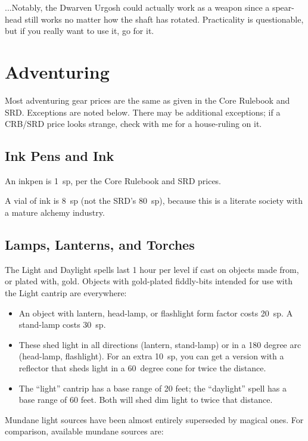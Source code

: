 ...Notably, the Dwarven Urgosh could actually work as a weapon since a
spear-head still works no matter how the shaft has rotated. Practicality
is questionable, but if you really want to use it, go for it.
%

%
%
\section{Adventuring}

Most adventuring gear prices are the same as given in the Core Rulebook and
SRD. Exceptions are noted below. There may be additional exceptions; if a
CRB/SRD price looks strange, check with me for a house-ruling on it.

%
\subsection{Ink Pens and Ink}

An inkpen is 1~sp, per the Core Rulebook and SRD prices.

A vial of ink is 8~sp (not the SRD's 80~sp), because this is a literate
society with a mature alchemy industry.
%

%
\subsection{Lamps, Lanterns, and Torches}

The Light and Daylight spells last 1 hour per level if cast on objects made
from, or plated with, gold. Objects with gold-plated fiddly-bits intended
for use with the Light cantrip are everywhere:

\begin{itemize}
%
\item An object with lantern, head-lamp, or flashlight form factor costs
20~sp. A stand-lamp costs 30~sp.
%
\item These shed light in all directions (lantern, stand-lamp) or in a 180
degree arc (head-lamp, flashlight). For an extra 10~sp, you can get a version
with a reflector that sheds light in a 60~degree cone for twice the distance.
%
\item The ``light'' cantrip has a base range of 20 feet; the ``daylight''
spell has a base range of 60 feet. Both will shed dim light to twice that
distance.
\end{itemize}

Mundane light sources have been almost entirely superseded by magical ones.
For comparison, available mundane sources are:

